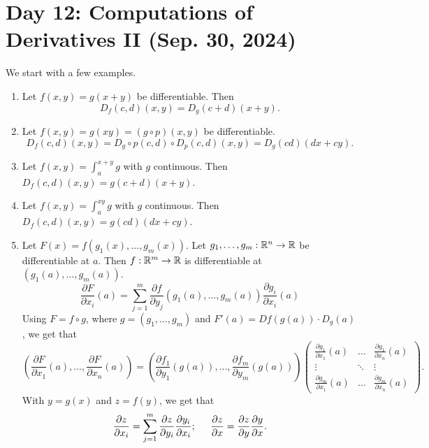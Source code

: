 \section{Day 12: Computations of Derivatives II (Sep. 30, 2024)}
We start with a few examples.
\begin{enumerate}[label=(\alph*)]
    \item Let $f(x, y) = g(x + y)$ be differentiable. Then
    \[ D_f(c, d)(x, y) = D_g(c + d)(x + y). \]
    \item Let $f(x, y) = g(xy) = (g \circ p)(x, y)$ be differentiable.
    \[ D_f(c, d)(x, y) = D_g \circ p(c, d) \circ D_p(c, d)(x, y) = D_g(cd)(dx + cy). \]
    \item Let $f(x, y) = \int_a^{x+y} g$ with $g$ continuous. Then $D_f(c, d)(x, y) = g(c + d)(x + y)$.
    \item Let $f(x, y) = \int_a^{xy} g$ with $g$ continuous. Then $D_f (c, d)(x, y) = g(cd)(dx + cy)$.
    \item Let $F(x) = f(g_1(x), \dots, g_m(x))$. Let $g_1, \dots, g_m : \mathbb R^n \to \mathbb R$ be differentiable at $a$. Then $f : \mathbb R^m \to \mathbb R$ is differentiable at $(g_1(a), \dots, g_m(a))$.
    \[ \frac{\partial F}{\partial x_i}(a) = \sum_{j=1}^m \frac{\partial f}{\partial y_j} (g_1(a), \dots, g_m(a)) \frac{\partial g_i}{\partial x_i}(a) \]
    Using $F = f \circ g$, where $g = (g_1, \dots, g_m)$ and $F'(a) = Df(g(a)) \cdot D_g(a)$, we get that
    \[ \left(\frac{\partial F}{\partial x_1}(a), \dots, \frac{\partial F}{\partial x_n}(a)\right) = \left(\frac{\partial f_1}{\partial y_1}(g(a)), \dots, \frac{\partial f_m}{\partial y_m}(g(a))\right) \begin{pmatrix} \frac{\partial g_1}{\partial x_1}(a) & \dots & \frac{\partial g_1}{\partial x_n}(a) \\ \vdots & \ddots & \vdots \\ \frac{\partial g_m}{\partial x_1}(a) & \dots & \frac{\partial g_m}{\partial x_n} (a) \end{pmatrix}. \]
    With $y = g(x)$ and $z = f(y)$, we get that
    \[ \frac{\partial z}{\partial x_i} = \sum_{j=1}^m \frac{\partial z}{\partial y_i} \frac{\partial y_i}{\partial x_i}; \hspace{0.2in} \frac{\partial z}{\partial x} = \frac{\partial z}{\partial y} \frac{\partial y}{\partial x}. \]
\end{enumerate}

